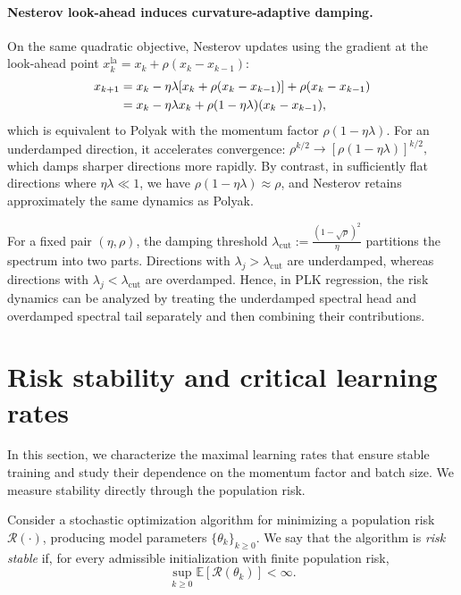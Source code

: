 \documentclass[11pt]{article}
\begin{document}
\paragraph{Nesterov look-ahead induces curvature-adaptive damping.} On the same quadratic objective, Nesterov updates using the gradient at the look-ahead point $x_k^{\mathrm{la}}= x_k+\rho(x_k-x_{k-1})$:
\begin{align}\label{eqn: curvature-adaptivity}
\notag x_{k+1} &= x_k - \eta \lambda [x_k+\rho(x_k-x_{k-1})] + \rho (x_k - x_{k-1})\\
&=x_k - \eta\lambda x_k + \rho(1-\eta\lambda) (x_k -x_{k-1}),
\end{align}
which is equivalent to Polyak with the momentum factor $\rho(1-\eta\lambda)$. 
For an underdamped direction, it accelerates convergence:
$
\rho^{k/2}
\to 
[\rho(1-\eta\lambda)]^{k/2},
$ 
which damps sharper directions more rapidly.
By contrast, in sufficiently flat directions where
\(\eta\lambda\ll1\), we have
\(\rho(1-\eta\lambda)\approx\rho\), and Nesterov retains
approximately the same  dynamics as Polyak.


\begin{remark}
For a fixed pair $(\eta,\rho)$, the damping threshold
$
\lambda_{\mathrm{cut}}
:=
\frac{(1-\sqrt{\rho})^2}{\eta}
$
partitions the spectrum into two parts. Directions with
$\lambda_j>\lambda_{\mathrm{cut}}$ are underdamped, whereas directions
with $\lambda_j<\lambda_{\mathrm{cut}}$ are overdamped. Hence, in PLK
regression, the risk dynamics can be analyzed by treating the
underdamped spectral head and overdamped spectral tail separately and
then combining their contributions.
\end{remark}

\section{Risk stability and critical learning rates}
\label{sec:stability}

In this section, we characterize the maximal learning rates that ensure stable training and study their dependence on the momentum factor and batch size. We measure stability directly through the population risk.

\begin{definition}
Consider a stochastic optimization algorithm for minimizing a population risk $\mathcal R(\cdot)$, producing model parameters $\{\theta_k\}_{k\ge 0}$. We say that the algorithm is \emph{risk stable} if, for every admissible initialization with finite population risk,
\[
\sup_{k\ge 0}\mathbb E[\mathcal R(\theta_k)]<\infty.
\]
\end{definition}
\end{document}
